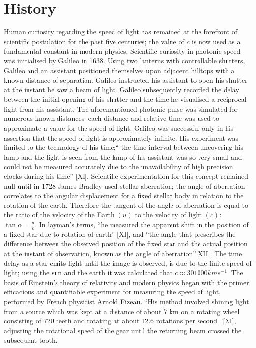 \documentclass[12pt,letterpaper]{article}
\begin{document}
\section{History}
Human curiosity regarding the speed of light has remained at the forefront of scientific postulation for the past five centuries; the value of $c$ is now used as a fundamental constant in modern physics. Scientific curiosity in photonic speed was initialised by Galileo in 1638. Using two lanterns with controllable shutters, Galileo and an assistant positioned themselves upon adjacent hilltops with a known distance of separation. Galileo instructed his assistant to open his shutter at the instant he saw a beam of light. Galileo subsequently recorded the delay between the initial opening of his shutter and the time he visualised a reciprocal light from his assistant. The aforementioned photonic pulse was simulated for numerous known distances; each distance and relative time was used to approximate a value for the speed of light. Galileo was successful only in his assertion that the speed of light is approximately infinite. His experiment was limited to the technology of his time;“ the time interval between uncovering his lamp and the light is seen from the lamp of his assistant was so very small and could not be measured accurately due to the unavailability of high precision clocks during his time” [XI]. Scientific experimentation for this concept remained null until in 1728 James Bradley used stellar aberration; the angle of aberration correlates to the angular displacement for a fixed stellar body in relation to the rotation of the earth. Therefore the tangent of the angle of aberration is equal to the ratio of the velocity of the Earth $(u)$ to the velocity of light $(c)$:  $\tan \alpha = \frac{u}{c}$. In layman's terms, “he measured the apparent shift in the position of a fixed star due to rotation of earth” [XI], and “the angle that prescribes the difference between the observed position of the fixed star and the actual position at the instant of observation, known as the angle of aberration”[XII]. The time delay as a star emits light until the image is observed, is due to the finite speed of light; using the sun and the earth it was calculated that $c \approx 301000 kms^{-1}$. The basis of Einstein's theory of relativity and modern physics began with the primer efficacious and quantifiable experiment for measuring the speed of light, performed by French physicist Arnold Fizeau. “His method involved shining light from a source which was kept at a distance of about 7 km on a rotating wheel consisting of 720 teeth and rotating at about 12.6 rotations per second ”[XI], adjusting the rotational speed of the gear until the returning beam crossed the subsequent tooth.
\end{document}
